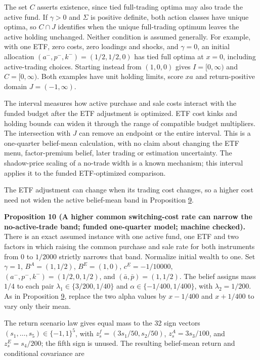 \documentclass[11pt]{article}
\begin{document}
The set \(C\) asserts existence, since tied full-trading optima may
also trade the active fund. If \(\gamma>0\) and \(\Sigma\) is positive
definite, both action classes have unique optima, so \(C\cap J\)
identifies when the unique full-trading optimum leaves the active
holding unchanged. Neither condition is assumed generally. For
example, with one ETF, zero costs, zero loadings and shocks, and
\(\gamma=0\), an initial allocation
\((a^-,p^-,k^-)=(1/2,1/2,0)\) has tied full optima at \(x=0\),
including active-trading choices. Starting instead from \((1,0,0)\)
gives \(I=[0,\infty)\) and \(C=[0,\infty)\). Both examples have unit
holding limits, score \(xa\) and return-positive domain
\(J=(-1,\infty)\).

The interval measures how active purchase and sale costs interact
with the funded budget after the ETF adjustment is optimized. ETF
cost kinks and holding bounds can widen it through the range of
compatible budget multipliers. The intersection with \(J\) can
remove an endpoint or the entire interval. This is a one-quarter
belief-mean calculation, with no claim about changing the ETF menu,
factor-premium belief, later trading or estimation uncertainty.
The shadow-price scaling of a no-trade width is a known mechanism;
this interval applies it to the funded ETF-optimized comparison.

The ETF adjustment can change when its trading cost changes, so a higher
cost need not widen the active belief-mean band in Proposition \hyperref[res:Proposition-9]{9}.

\label{res:Proposition-10}
\textbf{Proposition 10 (A higher common switching-cost rate can narrow the no-active-trade band; funded one-quarter model; machine checked).}
There is an exact assumed instance with one active fund, one ETF and
two factors in which raising the common purchase and sale rate for
both instruments from \(0\) to \(1/2000\) strictly narrows that band.
Normalize initial wealth to one. Set \(\gamma=1\),
\(B^A=(1,1/2)\), \(B^E=(1,0)\), \(c^E=-1/10000\),
\((a^-,p^-,k^-)=(1/2,0,1/2)\), and
\((\bar a,\bar p)=(1,1/2)\). The belief assigns mass \(1/4\)
to each pair
\(\lambda_1\in\{3/200,1/40\}\) and
\(\alpha\in\{-1/400,1/400\}\), with
\(\lambda_2=1/200\). As in Proposition \hyperref[res:Proposition-9]{9}, replace the two alpha
values by \(x-1/400\) and \(x+1/400\) to vary only their mean.

The return scenario law gives equal mass to the 32 sign vectors
\((s_1,\ldots,s_5)\in\{-1,1\}^5\), with
\(z^f_s=(3s_1/50,s_2/50)\),
\(z^A_s=3s_3/100\), and \(z^E_s=s_4/200\);
the fifth sign is unused. The resulting belief-mean return and
conditional covariance are
\end{document}
